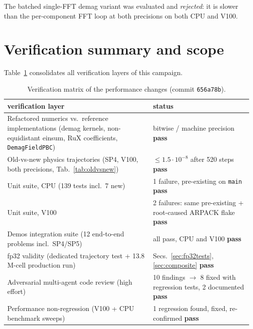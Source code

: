 \documentclass[11pt,a4paper]{article}
\newcommand{\ok}{\textcolor{green!50!black}{\textbf{pass}}}
\newcommand{\preexisting}{\textcolor{orange!80!black}{pre-existing}}
\begin{document}
The batched single-FFT demag variant was evaluated and \emph{rejected}: it is
slower than the per-component FFT loop at both precisions on both CPU and V100.

\section{Verification summary and scope}
\label{sec:matrix}

Table~\ref{tab:matrix} consolidates all verification layers of this campaign.

\begin{table}[h]\centering\small
\begin{tabular}{p{9.2cm}l}
\toprule
verification layer & status \\
\midrule
Refactored numerics vs.\ reference implementations (demag kernels, non-equidistant einsum, RuX coefficients, \texttt{DemagFieldPBC}) & bitwise / machine precision \ok \\
Old-vs-new physics trajectories (SP4, V100, both precisions, Tab.~\ref{tab:oldvsnew}) & $\le 1.5\cdot10^{-8}$ after 520 steps \ok \\
Unit suite, CPU (139 tests incl.\ 7 new) & 1 failure, \preexisting{} on \texttt{main} \ok \\
Unit suite, V100 & 2 failures: same \preexisting{} + root-caused ARPACK flake \ok \\
Demos integration suite (12 end-to-end problems incl.\ SP4/SP5) & all pass, CPU and V100 \ok \\
fp32 validity (dedicated trajectory test + 13.8\,M-cell production run) & Secs.~\ref{sec:fp32tests}, \ref{sec:composite} \ok \\
Adversarial multi-agent code review (high effort) & 10 findings $\to$ 8 fixed with regression tests, 2 documented \ok \\
Performance non-regression (V100 + CPU benchmark sweeps) & 1 regression found, fixed, re-confirmed \ok \\
\bottomrule
\end{tabular}
\caption{Verification matrix of the performance changes (commit \texttt{656a78b}).}
\label{tab:matrix}
\end{table}
\end{document}
